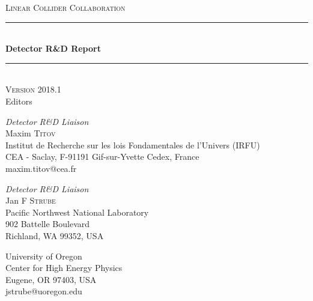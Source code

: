 \documentclass[10pt,final]{report}
\begin{document}
\begin{titlepage} 
    \newcommand{\HRule}{\rule{\linewidth}{0.5mm}} %
	\center %
	
	
	\textsc{\LARGE Linear Collider Collaboration}\\[1.5cm] %
		
	
	
	\HRule\\[0.4cm]
	
	{\huge\bfseries Detector R\&D Report}\\[0.4cm] %
	
	\HRule\\[1.5cm]

    \textsc{\Large Version 2018.1}\\[0.5cm] %

	\vfill\vfill
	{\large Editors\\}
	\begin{minipage}[t]{0.49\textwidth}
		\begin{flushleft}
			\large
			\textit{Detector R\&D Liaison}\\
			Maxim \textsc{Titov} \\
			Institut de Recherche sur les lois Fondamentales de l'Univers (IRFU) \\
			CEA - Saclay, F-91191 Gif-sur-Yvette Cedex, France\\
			maxim.titov@cea.fr
		\end{flushleft}
	\end{minipage}\hfill
	\begin{minipage}[t]{0.49\textwidth}
		\begin{flushright}
			\large
			\textit{Detector R\&D Liaison}\\
			Jan F \textsc{Strube} \\
			Pacific Northwest National Laboratory \\
			902 Battelle Boulevard \\
			Richland, WA 99352, USA \\
		\end{flushright}
			\begin{flushright}
				\large
			University of Oregon \\
			Center for High Energy Physics \\
			Eugene, OR 97403, USA \\
			jstrube@uoregon.edu
			\end{flushright}
	\end{minipage}
		

\end{titlepage}
\end{document}
